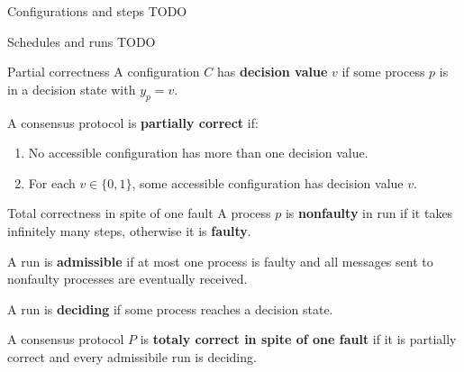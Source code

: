 \documentclass[12pt]{beamer}
\begin{document}
  \begin{frame}{Configurations and steps}
    TODO
  \end{frame}

  \begin{frame}{Schedules and runs}
    TODO
  \end{frame}

  \begin{frame}{Partial correctness}
    A configuration \(C\) has \textbf{decision value} \(v\) if some process \(p\) is in a decision state with \(y_p = v\).

    \vspace{0.25cm}

    \begin{definition}
      A consensus protocol is \textbf{partially correct} if:
      \begin{enumerate}
        \item No accessible configuration has more than one decision value.
        \item For each \(v\in \{0,1\}\), some accessible configuration has decision value \(v\).
      \end{enumerate}
    \end{definition}
  \end{frame}

  \begin{frame}{Total correctness in spite of one fault}
    A process \(p\) is \textbf{nonfaulty} in run if it takes infinitely many steps, otherwise it is \textbf{faulty}.

    \vspace{0.25cm}

    A run is \textbf{admissible} if at most one process is faulty and all messages sent to nonfaulty processes are eventually received.

    \vspace{0.25cm}

    A run is \textbf{deciding} if some process reaches a decision state.

    \vspace{0.25cm}

    \begin{definition}
      A consensus protocol \(P\) is \textbf{totaly correct in spite of one fault} if it is partially correct and every admissibile run is deciding.
    \end{definition}
  \end{frame}
\end{document}
